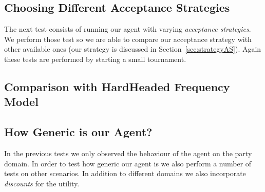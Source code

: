 
\subsection{Choosing Different Acceptance Strategies}

The next test consists of running our agent with varying \emph{acceptance strategies}. We perform those test so we are able to compare our acceptance strategy with other available ones (our strategy is discussed in Section~\ref{sec:strategyAS}). Again these tests are performed by starting a small tournament. \\


\subsection{Comparison with HardHeaded Frequency Model}

\subsection{How Generic is our Agent?}

In the previous tests we only observed the behaviour of the agent on the party domain. In order to test how generic our agent is we also perform a number of tests on other scenarios. In addition to different domains we also incorporate \emph{discounts} for the utility. \\


